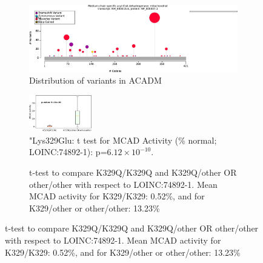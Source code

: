 \begin{figure}[htbp]
    \centering
    \begin{subfigure}[b]{0.95\textwidth}
    \centering
    \includegraphics[width=\textwidth]{ img/ACADM_protein_diagram.pdf} 
    \captionsetup{justification=raggedright,singlelinecheck=false}
    \caption{Distribution of variants in ACADM}
    \end{subfigure}
    
    \vspace{2em}

    \begin{subfigure}[b]{0.95\textwidth}
    \centering
    \includegraphics[width=0.3\textwidth]{ img/acadm_k329q.pdf} 
    \captionsetup{justification=raggedright,singlelinecheck=false}
    \caption{"Lys329Glu: t test for MCAD Activity (\% normal; LOINC:74892-1): p=$6.12\times 10^{-10}$.}
    \end{subfigure}
    
    \vspace{2em}
    
    \begin{subfigure}[b]{0.95\textwidth}
    \captionsetup{justification=raggedright,singlelinecheck=false}
    \caption{t-test to compare K329Q/K329Q and K329Q/other OR other/other with respect to LOINC:74892-1. Mean MCAD activity for K329/K329: 0.52\%, and for K329/other or other/other: 13.23\% }
    \end{subfigure}
    

\end{figure}
